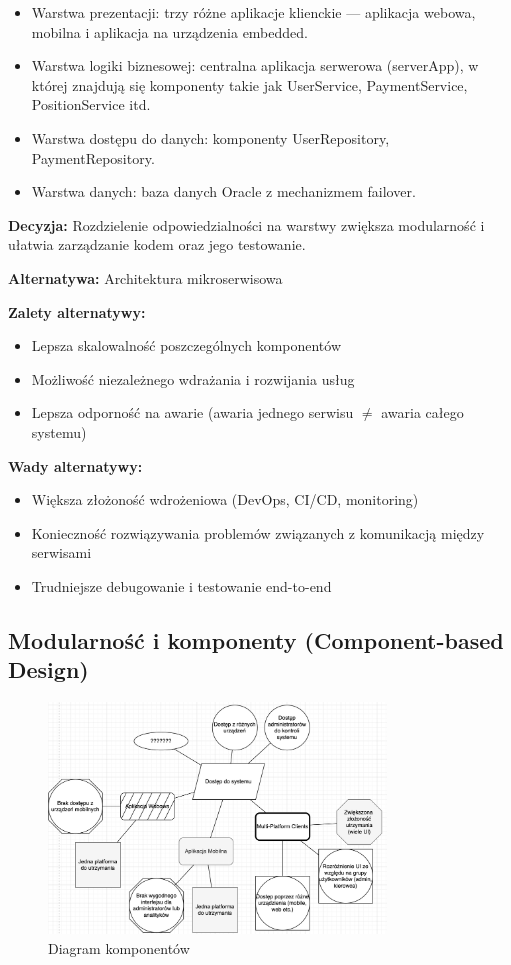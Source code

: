 \documentclass[12pt]{article}
\begin{document}
\begin{itemize}
\item Warstwa prezentacji: trzy różne aplikacje klienckie — aplikacja webowa, mobilna i aplikacja na urządzenia embedded.
\item Warstwa logiki biznesowej: centralna aplikacja serwerowa (serverApp), w której znajdują się komponenty takie jak UserService, PaymentService, PositionService itd.
\item Warstwa dostępu do danych: komponenty UserRepository, PaymentRepository.
\item Warstwa danych: baza danych Oracle z mechanizmem failover.
\end{itemize}

\textbf{Decyzja:} Rozdzielenie odpowiedzialności na warstwy zwiększa modularność i ułatwia zarządzanie kodem oraz jego testowanie.

\textbf{Alternatywa:} Architektura mikroserwisowa

\textbf{Zalety alternatywy:}
\begin{itemize}
\item Lepsza skalowalność poszczególnych komponentów
\item Możliwość niezależnego wdrażania i rozwijania usług
\item Lepsza odporność na awarie (awaria jednego serwisu $\neq$ awaria całego systemu)
\end{itemize}

\textbf{Wady alternatywy:}
\begin{itemize}
\item Większa złożoność wdrożeniowa (DevOps, CI/CD, monitoring)
\item Konieczność rozwiązywania problemów związanych z komunikacją między serwisami
\item Trudniejsze debugowanie i testowanie end-to-end
\end{itemize}

\subsection{Modularność i komponenty (Component-based Design)}
\begin{figure}[h]
\centering
\includegraphics[width=0.8\textwidth]{dostep_do_systemu.png}
\caption{Diagram komponentów}
\label{fig:components}
\end{figure}
\end{document}
